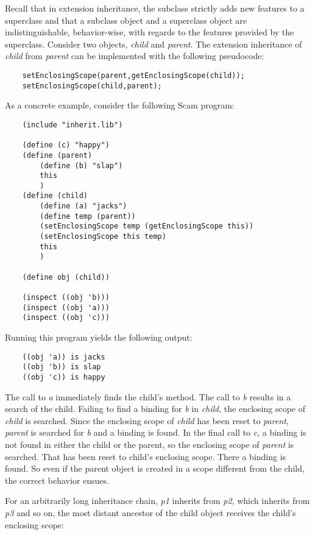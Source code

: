 Recall that in extension inheritance, the subclass strictly adds
new features to a superclass and that a subclass object and a
superclass object are indistinguishable, behavior-wise, with regards
to the features provided by the superclass.  
Consider two objects, {\it child} and {\it parent}. The extension
inheritance of {\it child} from {\it parent} can be implemented with
the following pseudocode:

\begin{verbatim}
    setEnclosingScope(parent,getEnclosingScope(child));
    setEnclosingScope(child,parent);
\end{verbatim}

As a concrete example, consider the following Scam program:

\begin{verbatim}
    (include "inherit.lib")

    (define (c) "happy")
    (define (parent)
        (define (b) "slap")
        this
        )
    (define (child)
        (define (a) "jacks")
        (define temp (parent))
        (setEnclosingScope temp (getEnclosingScope this))
        (setEnclosingScope this temp)
        this
        )

    (define obj (child))

    (inspect ((obj 'b)))
    (inspect ((obj 'a)))
    (inspect ((obj 'c)))
\end{verbatim}

Running this program yields the following output:

\begin{verbatim}
    ((obj 'a)) is jacks
    ((obj 'b)) is slap
    ((obj 'c)) is happy
\end{verbatim}

The call to {\it a} immediately finds the child's method.  The call to
{\it b} results in a search of the child. Failing to find a binding
for {\it b} in {\it child}, the enclosing scope of {\it child} is
searched. Since the enclosing scope of {\it child} has been reset to {\it
parent}, {\it parent} is searched for {\it b} and a binding is found.
In the final call to {\it c}, a binding is not found in either the
child or the parent, so the enclosing scope of {\it parent} is searched.
That has been reset to {\sc child}'s enclosing scope. There a binding
is found. So even if the parent object is created in a scope different
from the child, the correct behavior ensues.

For an arbitrarily long inheritance chain, {\it p1} inherits from {\it
p2}, which inherits from {\it p3} and so on, the most distant ancestor
of the child object receives the child's enclosing scope:

